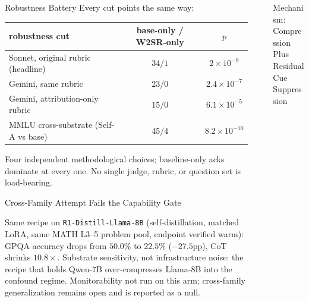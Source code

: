 \documentclass[final]{beamer}
\newlength{\sepwidth}
\newlength{\colwidth}
\newcommand{\separatorcolumn}{\begin{column}{\sepwidth}\end{column}}
\begin{document}
\begin{frame}[t]
\begin{columns}[t]
\begin{column}{\colwidth}
\begin{block}{Robustness Battery}
    \smallskip
    Every cut points the same way:

    \begin{center}
      \renewcommand{\arraystretch}{1.25}
      \small
      \begin{tabular}{lcc}
        \toprule
        robustness cut & base-only / W2SR-only & $p$ \\
        \midrule
        Sonnet, original rubric (headline)   & $34 / 1$ & $2 \!\times\! 10^{-9}$ \\
        Gemini, same rubric                  & $23 / 0$ & $2.4 \!\times\! 10^{-7}$ \\
        Gemini, attribution-only rubric      & $15 / 0$ & $6.1 \!\times\! 10^{-5}$ \\
        MMLU cross-substrate (Self-A vs base) & $45 / 4$ & $8.2 \!\times\! 10^{-10}$ \\
        \bottomrule
      \end{tabular}
    \end{center}

    Four independent methodological choices; baseline-only acks dominate at every one. No single judge, rubric, or question set is load-bearing.

  \end{block}

  \begin{block}{Cross-Family Attempt Fails the Capability Gate}

    Same recipe on \texttt{R1-Distill-Llama-8B} (self-distillation, matched LoRA, same MATH L3--5 problem pool, endpoint verified warm): GPQA accuracy drops from $50.0\%$ to $22.5\%$ ($-27.5$pp), CoT shrinks $10.8\times$. Substrate sensitivity, not infrastructure noise: the recipe that holds Qwen-7B over-compresses Llama-8B into the confound regime. Monitorability not run on this arm; cross-family generalization remains open and is reported as a null.

  \end{block}

\end{column}

\separatorcolumn

\begin{column}{\colwidth}

  \begin{block}{Mechanism: Compression Plus Residual Cue Suppression}


\end{block}
\end{column}
\end{columns}
\end{frame}
\end{document}
